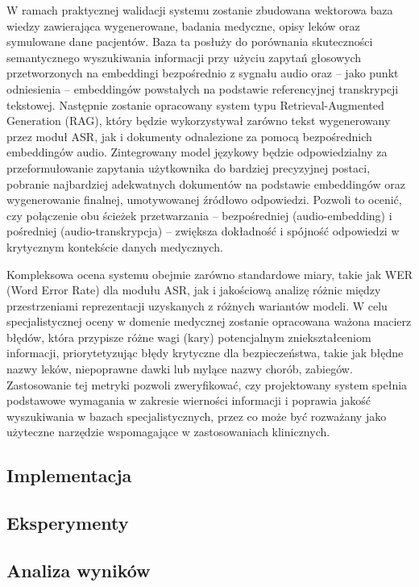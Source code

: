 W ramach praktycznej walidacji systemu zostanie zbudowana wektorowa baza wiedzy zawierająca wygenerowane, badania medyczne, opisy leków oraz symulowane dane pacjentów. Baza ta posłuży do porównania skuteczności semantycznego wyszukiwania informacji przy użyciu zapytań głosowych przetworzonych na embeddingi bezpośrednio z sygnału audio oraz – jako punkt odniesienia – embeddingów powstałych na podstawie referencyjnej transkrypcji tekstowej. Następnie zostanie opracowany system typu Retrieval-Augmented Generation (RAG), który będzie wykorzystywał zarówno tekst wygenerowany przez moduł ASR, jak i dokumenty odnalezione za pomocą bezpośrednich embeddingów audio. Zintegrowany model językowy będzie odpowiedzialny za przeformułowanie zapytania użytkownika do bardziej precyzyjnej postaci, pobranie najbardziej adekwatnych dokumentów na podstawie embeddingów oraz wygenerowanie finalnej, umotywowanej źródłowo odpowiedzi. Pozwoli to ocenić, czy połączenie obu ścieżek przetwarzania – bezpośredniej (audio-embedding) i pośredniej (audio-transkrypcja) – zwiększa dokładność i spójność odpowiedzi w krytycznym kontekście danych medycznych.

Kompleksowa ocena systemu obejmie zarówno standardowe miary, takie jak WER (Word Error Rate) dla modułu ASR, jak i jakościową analizę różnic między przestrzeniami reprezentacji uzyskanych z różnych wariantów modeli. W celu specjalistycznej oceny w domenie medycznej zostanie opracowana ważona macierz błędów, która przypisze różne wagi (kary) potencjalnym zniekształceniom informacji, priorytetyzując błędy krytyczne dla bezpieczeństwa, takie jak błędne nazwy leków, niepoprawne dawki lub mylące nazwy chorób, zabiegów. Zastosowanie tej metryki pozwoli zweryfikować, czy projektowany system spełnia podstawowe wymagania w zakresie wierności informacji i poprawia jakość wyszukiwania w bazach specjalistycznych, przez co może być rozważany jako użyteczne narzędzie wspomagające w zastosowaniach klinicznych.

\subsection{Implementacja}
\subsection{Eksperymenty}
\subsection{Analiza wyników}
